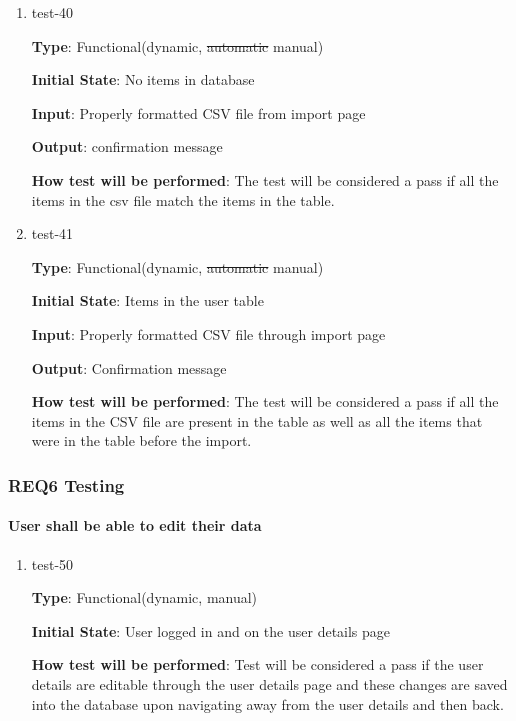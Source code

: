 \documentclass[12pt, titlepage]{article}
\begin{document}
\begin{enumerate}
\item{test-40\\}

\textbf{Type}: Functional(dynamic, \sout{automatic} manual)
					
\textbf{Initial State}: No items in database
					
\textbf{Input}: Properly formatted CSV file from import page
					
\textbf{Output}: confirmation message 
					
\textbf{How test will be performed}: The test will be considered a pass if all the items in the csv file match the items in the table.
					
\item{test-41\\}

\textbf{Type}: Functional(dynamic, \sout{automatic} manual)
					
\textbf{Initial State}: Items in the user table
					
\textbf{Input}: Properly formatted CSV file through import page
					
\textbf{Output}: Confirmation message
					
\textbf{How test will be performed}: The test will be considered a pass if all the items in the CSV file are present in the table as well as all the items that were in the table before the import.

\end{enumerate}

\subsubsection{REQ6 Testing}
		
\paragraph{User shall be able to edit their data}

\begin{enumerate}
\item{test-50\\}

\textbf{Type}: Functional(dynamic, manual)
					
\textbf{Initial State}: User logged in and on the user details page

\textbf{How test will be performed}: Test will be considered a pass if the user details are editable through the user details page and these changes are saved into the database upon navigating away from the user details and then back. 

\end{enumerate}
\end{document}
